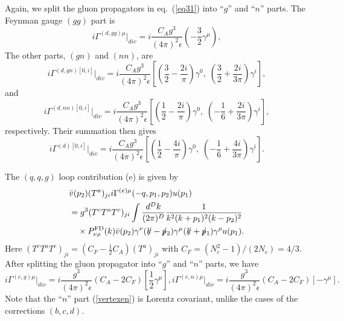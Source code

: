 \documentclass[preprint,amsmath,amssymb,superscriptaddress, floatfix,nofootinbib]{revtex4}
\def\psla{p\kern-.45em/}
\def\ksla{k\kern-.45em/}
\begin{document}
Again, we split the gluon propagators in eq.~(\ref{eq31}) into 
``$g$'' and ``$n$'' parts.  
The Feynman gauge $(gg)$ part is 
\begin{equation}
i\Gamma^{(d, gg)\mu}|_{div}= i\frac{C_A g^3}{(4\pi)^2\epsilon}
\left( -\frac{3}{2} \gamma^{\mu} \right), 
\label{vertexgg}
\end{equation}
%
The other parts, $(gn)$ and $(nn)$, are 
%
\begin{equation}
i\Gamma^{(d, gn)[0,i]}|_{div} = i\frac{C_A g^3}{(4\pi)^2\epsilon}
\left[ \left( \frac{3}{2}-\frac{2i}{\pi}\right)\gamma^0, \; 
\left( \frac{3}{2} +\frac{2i}{3\pi} \right) \gamma^i \right] ,
\label{vertexgn}
\end{equation}
%
and 
%
\begin{equation}
i\Gamma^{(d,nn)[0,i]}|_{div} = i\frac{C_A g^3}{(4\pi)^2\epsilon}
\left[ \left( \frac{1}{2}-\frac{2i}{\pi}\right)\gamma^0, \; 
\left( -\frac{1}{6} +\frac{2i}{3\pi} \right) \gamma^i \right] ,
\label{vertexnn}
\end{equation}
%
respectively. Their summation then gives 
%
\begin{equation}
i\Gamma^{(d)[0,i]}|_{div} = i\frac{C_A g^3}{(4\pi)^2\epsilon}
\left[ \left( \frac{1}{2}-\frac{4i}{\pi}\right)\gamma^0, \; 
\left( -\frac{1}{6} +\frac{4i}{3\pi} \right) \gamma^i \right] .
\label{vertexd}
\end{equation}
%

The $(q,q,g)$ loop contribution (e) is given by 
\begin{align}
& \bar{v}(p_2)(T^a)_{ji} i\Gamma^{(e)\mu}(-q,p_1,p_2) u(p_1)  
\nonumber \\
& = 
g^3 (T^c T^a T^c)_{ji} 
\int \frac{d^D k}{(2\pi)^D} \frac{1}{k^2(k+p_1)^2(k-p_2)^2}
\nonumber \\
&\quad \times P^{\rm FD}_{\nu\rho}(k) 
\bar{v}(p_2) 
\gamma^{\nu}(\ksla-\psla_2) \gamma^{\mu} (\ksla+\psla_1) \gamma^{\rho} u(p_1) . \label{eq35}
\end{align}
Here $(T^c T^a T^c)_{ji}=(C_F-\frac{1}{2}C_A)(T^a)_{ji}$ with 
$C_F=(N_c^2-1)/(2N_c)=4/3$. 
%
After splitting the gluon propagator into ``$g$'' and ``$n$'' parts, 
we have 
%
\begin{subequations}
\begin{equation}
i\Gamma^{(e,g)\mu} |_{div}  =i\frac{g^3}{(4\pi)^2\epsilon} (C_A-2C_F)
\left[ \frac{1}{2}\gamma^{\mu}  \right] , \label{vertexeg}
\end{equation}    
\begin{equation}
i\Gamma^{(e,n)\mu} |_{div}  =i\frac{g^3}{(4\pi)^2\epsilon} (C_A-2C_F)
\left[ -\gamma^{\mu} \right] .  
\label{vertexen}
\end{equation}
\end{subequations}
Note that the ``$n$'' part (\ref{vertexen}) is Lorentz covariant, unlike 
the cases of the corrections $(b,c,d)$. 
\end{document}
